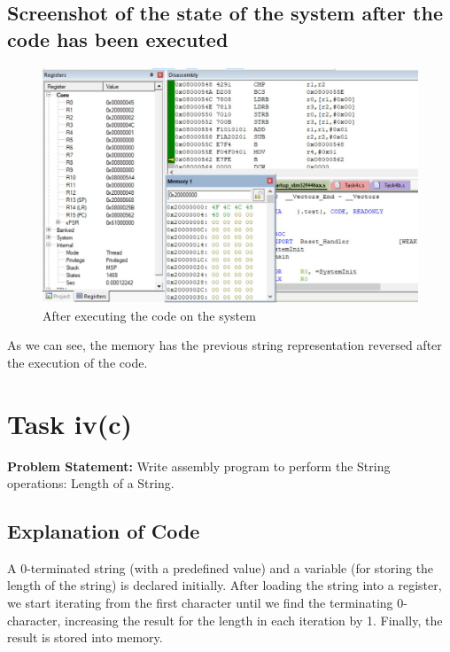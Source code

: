 \documentclass[footheight=20pt, footsepline, headheight=20pt, headsepline]{scrartcl}
\begin{document}
\subsection*{Screenshot of the state of the system after the code has been executed}
\begin{figure}[h!]
    \centering
    \includegraphics[scale=.7]{images/Task4b_After1.jpg}
    \caption{After executing the code on the system}
    \label{fig:after_task_4b}
\end{figure}
\FloatBarrier
As we can see, the memory has the previous string representation reversed after the execution of the code.


\FloatBarrier
{}
\section*{Task iv(c)}
\textbf{Problem Statement:} Write assembly program to perform the String operations: Length of a String.
\subsection*{Explanation of Code}
A 0-terminated string (with a predefined value) and a variable (for storing the length of the string) is declared initially. After loading the string into a register, we start iterating from the first character until we find the terminating 0-character, increasing the result for the length in each iteration by 1. Finally, the result is stored into memory.
\end{document}
